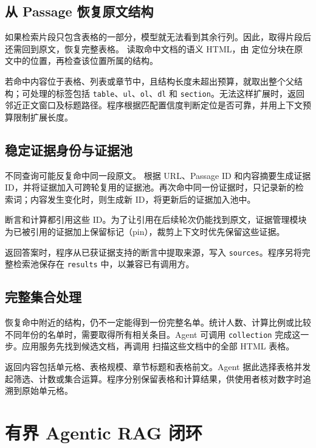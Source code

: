 \documentclass[UTF8,zihao=-4,fontset=fandol]{ctexart}
\newcommand{\passage}{Passage}
\newcommand{\code}[1]{\texttt{#1}}
\begin{document}
\subsection{从 Passage 恢复原文结构}

如果检索片段只包含表格的一部分，模型就无法看到其余行列。因此，取得片段后还需回到原文，恢复完整表格。 读取命中文档的语义 HTML，由  定位分块在原文中的位置，再检查该位置所属的结构。

若命中内容位于表格、列表或章节中，且结构长度未超出预算，就取出整个父结构；可处理的标签包括 \code{table}、\code{ul}、\code{ol}、\code{dl} 和 \code{section}。无法这样扩展时，返回邻近正文窗口及标题路径。程序根据匹配置信度判断定位是否可靠，并用上下文预算限制扩展长度。

\subsection{稳定证据身份与证据池}

不同查询可能反复命中同一段原文。 根据 URL、\passage{} ID 和内容摘要生成证据 ID，并将证据加入可跨轮复用的证据池。再次命中同一份证据时，只记录新的检索词；内容发生变化时，则生成新 ID，将更新后的证据加入池中。

断言和计算都引用这些 ID。为了让引用在后续轮次仍能找到原文，证据管理模块为已被引用的证据加上保留标记（pin），裁剪上下文时优先保留这些证据。

返回答案时，程序从已获证据支持的断言中提取来源，写入 \code{sources}。程序另将完整检索池保存在 \code{results} 中，以兼容已有调用方。

\subsection{完整集合处理}

恢复命中附近的结构，仍不一定能得到一份完整名单。统计人数、计算比例或比较不同年份的名单时，需要取得所有相关条目。Agent 可调用 \code{collection} 完成这一步。应用服务先找到候选文档，再调用  扫描这些文档中的全部 HTML 表格。

返回内容包括单元格、表格规模、章节标题和表格前文。Agent 据此选择表格并发起筛选、计数或集合运算。程序分别保留表格和计算结果，供使用者核对数字时追溯到原始单元格。

\section{有界 Agentic RAG 闭环}
\end{document}
